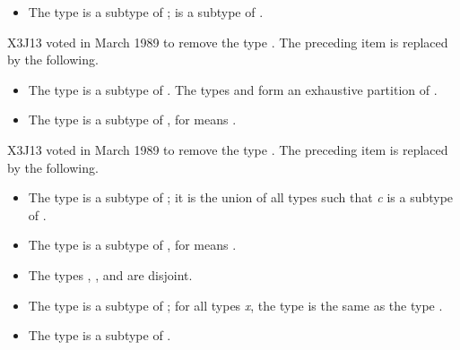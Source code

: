 \begin{obsolete}
\begin{itemize}
\item
The type  is a subtype of ;
 is a subtype of .
\end{itemize}
\end{obsolete}


\begin{newer}
X3J13 voted in March 1989  to remove the type .
The preceding item is replaced by the following.
\begin{itemize}
\item
The type  is a subtype of .
The types  and 
form an exhaustive partition of .
\end{itemize}
\end{newer}

\begin{obsolete}
\begin{itemize}
\item
The type  is a subtype of , for 
means .
\end{itemize}
\end{obsolete}

\newpage%
\begin{newer}
X3J13 voted in March 1989  to remove the type .
The preceding item is replaced by the following.
\begin{itemize}
\item
The type  is a subtype of ; it is the union of
all types  such that {\it c} is a subtype of .
\end{itemize}
\end{newer}

\begin{itemize}
\item
The type  is a subtype of , for 
means .

\item
The types , , and  are disjoint.

\item
The type  is a subtype of ; for all types {\it x},
the type  is the same as the type .

\item
The type  is a subtype of .
\end{itemize}

